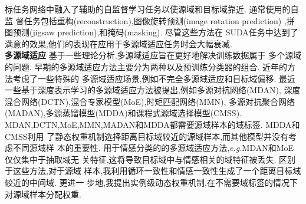 标任务网络中融入了辅助的自监督学习任务以使源域和目标域靠近. 通常使用的自监
督任务包括重构(reconstruction)\cite{ghifary2015domain,ghifary2016deep,chen2020fido},图像旋转预测(image rotation prediction)\cite{sun2019unsupervised,xu2019self}
,拼图预测(jigsaw prediction)\cite{carlucci2019domain},和掩码(masking)\cite{vu2020effective}. 尽管这些方法在
SUDA任务中达到了满意的效果,他们的表现在应用于多源域适应任务时会大幅衰减. \\
\textbf{多源域适应} 基于一些理论分析\cite{ben2010theory,hoffman2018algorithms},多源域适应旨在更好地解决训练数据属于
多个源域的问题\cite{sun2015survey,zhao2019multi}. 早期的多源域适应方法主要分为两种\cite{sun2015survey,sun2011two,duan2012exploiting,chattopadhyay2012multisource,duan2012domain}以及预训练分类器的组合\cite{xu2012multi,sun2013bayesian}. 近年的方法考虑了一些特殊的
多源域适应场景,例如不完全多源域适应\cite{ding2018incomplete}和目标域偏移\cite{redko2019optimal}. 
最近一些基于深度表示学习的多源域适应方法被提出,例如多源对抗网络(MDAN)\cite{zhao2018adversarial},
深度混合网络(DCTN)\cite{xu2018deep},混合专家模型(MoE)\cite{guo2018multi},时矩匹配网络(MMN)\cite{peng2019moment},
多源对抗聚合网络(MADAN)\cite{zhao2019multi},多源蒸馏模型(MDDA)\cite{zhao2020distilling}和课程式源域选择模型(CMSS)\cite{yang2020curriculum}. 
MDAN,DCTN,MoE,MMN,MADAN和MDDA都需要源域样本的域标签. MDDA和CMSS利用
了静态权重机制选择距离目标域较近的源域样本,而其他模型并没有考虑不同源域样
本的重要性. 用于情感分类的的多源域适应方法,\textit{e.g.}MDAN和MoE仅仅集中于抽取域无
关特征,这将导致目标域中与情感相关的域特征被丢失. 区别于这些方法,对于源域
样本,我利用循环一致性和情感一致性生成了一个距离目标域较近的中间域. 更进一
步地,我提出实例级动态权重机制,在不需要域标签的情况下对源域样本分配权重. 